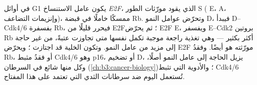 \begin{proposition}\label{prop:b3:cell-cycle-apoptosis:rb}
في أوائل G1 يكون عامل الاستنساخ \emph{E2F}، الذي يقود مورّثات
الطور S ( E،  A، وإنزيمات التضاعف)، ممسكًا
خاملًا في قبضة \emph{} Rb. وتحرّض عوامل النمو
 D، فيبدأ  D--Cdk4/6 بفسفرة Rb، فيحرر
قليلًا من E2F؛ ثم يحرّض E2F  E، ويفسفر  E--Cdk2
بروتين Rb أكثر بكثير --- وهي تغذية راجعة موجبة تكمل نفسها متى تجاوزت عتبةً،
من غير حاجة إلى مزيد من عامل النمو. وتكون الخلية قد اجتازت
؛ ويحرّض E2F مورّثته هو أيضًا. وفقدُ Rb، أو
فقدُ مثبط Cdk4/6 وهو p16، أو تضخيم  D، يزيل
الحاجة إلى عامل النمو أصلًا، وكل منها شائع في
السرطان (\cref{ch:b3:cancer-biology})؛ والأدوية التي تثبط Cdk4/6 تُستعمل اليوم
ضد سرطانات الثدي التي تعتمد على هذا المفتاح.
\end{proposition}

